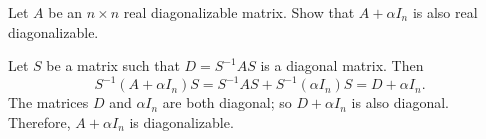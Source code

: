 \documentclass{ximera}
\begin{document}
\begin{exercise} \label{c10.3.6}
Let $A$ be an $n\times n$ real diagonalizable matrix. Show that $A+\alpha I_n$
is also real diagonalizable.

\begin{solution}

\soln
Let $S$ be a matrix such that $D = S^{-1}AS$ is a diagonal matrix.
Then
\[
S^{-1}(A + \alpha I_n)S = S^{-1}AS + S^{-1}(\alpha I_n)S =
D + \alpha I_n.
\]
The matrices $D$ and $\alpha I_n$ are both diagonal; so $D + \alpha I_n$
is also diagonal.  Therefore, $A + \alpha I_n$ is diagonalizable.


\end{solution}
\end{exercise}
\end{document}
